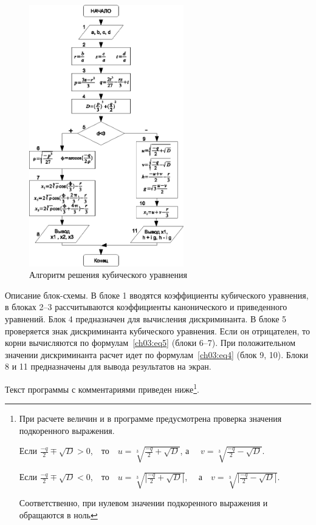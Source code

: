 \begin{figure}[ht]
\begin{center}
\includegraphics[width=0.6\textwidth]{img/ris_3_19}
\caption{Алгоритм решения кубического уравнения}
\label{ch03:refDrawing18}
\end{center}
\end{figure}

Описание блок-схемы. В блоке 1 вводятся коэффициенты кубического уравнения, в блоках 2--3 рассчитываются коэффициенты
канонического и приведенного уравнений. Блок 4 предназначен для вычисления дискриминанта. В блоке 5 проверяется знак
дискриминанта кубического уравнения. Если он отрицателен, то корни вычисляются по формулам~\ref{ch03:eq5} (блоки 6--7). При
положительном значении дискриминанта расчет идет по формулам~\ref{ch03:eq4} (блок 9, 10). Блоки 8 и 11 предназначены для вывода результатов на экран.

Текст программы с комментариями приведен ниже\footnote{При расчете величин  и  в
программе предусмотрена проверка значения подкоренного выражения. 

Если  $\frac{-q}{2}\mp\sqrt{D}>0$,\ \ то\ \ $u=\sqrt[{3}]{\frac{-q}{2}+\sqrt{D}}$, 
а \ \ $v=\sqrt[{3}]{\frac{-q}{2}-\sqrt{D}}$.

Если  $\frac{-q}{2}\mp\sqrt{D}<0$,\ \ то\ \ $u=\sqrt[{3}]{|\frac{-q}{2}+\sqrt{D}|}$,
\ \  а\ \ $v=\sqrt[{3}]{|\frac{-q}{2}-\sqrt{D}|}$.

Соответственно, при нулевом значении подкоренного выражения  и  обращаются
в ноль}.

